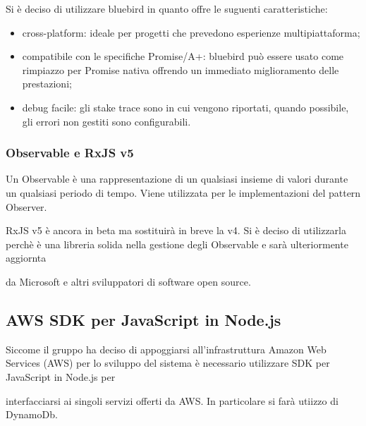 Si è deciso di utilizzare bluebird in quanto offre le suguenti caratteristiche:

\begin{itemize}

\item cross-platform: ideale per progetti che prevedono esperienze multipiattaforma;

\item compatibile con le specifiche Promise/A+: bluebird può essere usato come rimpiazzo per Promise nativa offrendo un immediato miglioramento delle prestazioni;

\item debug facile: gli stake trace sono in cui vengono riportati, quando possibile, gli errori non gestiti sono configurabili.

\end{itemize}


\subsubsection{Observable e RxJS v5}

Un Observable è una rappresentazione di un qualsiasi insieme di valori durante un qualsiasi periodo di tempo. Viene utilizzata per le implementazioni del pattern Observer.

RxJS v5 è ancora in beta ma sostituirà in breve la v4. Si è deciso di utilizzarla perchè è una libreria solida nella gestione degli Observable e sarà ulteriormente aggiornta

da Microsoft e altri sviluppatori di software open source.


\subsection{AWS SDK per JavaScript in Node.js}

Siccome il gruppo ha deciso di appoggiarsi all'infrastruttura Amazon Web Services (AWS) per lo sviluppo del sistema è necessario utilizzare SDK per JavaScript in Node.js per

interfacciarsi ai singoli servizi offerti da AWS. In particolare si farà utiizzo di DynamoDb.